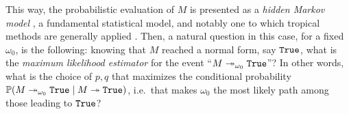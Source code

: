 This way, the probabilistic evaluation of $M$ is presented as a \emph{hidden Markov model} \cite{Baum1966}, a fundamental statistical model, and notably one to which tropical methods are generally applied \cite{Pachter2004}.
Then, a natural question in this case, for a fixed $\omega_0$, is the following:
%
knowing that $M$ reached a normal form, say $\mathtt{True}$, %
 what is the \emph{maximum likelihood estimator} for the event ``$M\twoheadrightarrow_{\omega_0}\mathtt{True}$''? %
In other words, what is the choice of $p,q$ that maximizes the conditional probability $\mathbb{P}(M\twoheadrightarrow_{\omega_0} \mathtt{True}\mid M\twoheadrightarrow \mathtt{True})$, i.e.~that 
 makes $\omega_0$ the most likely path among those leading to $\mathtt{True}$?
%

